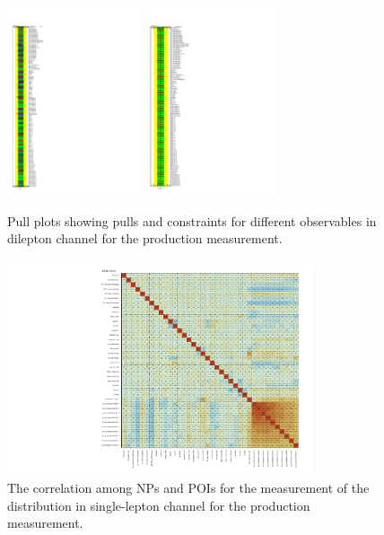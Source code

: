 \begin{figure}[ht]
  \centering
  \includegraphics[width=0.35\textwidth]{figures/diff_xsec/dilep_tty_prod_mu_blinded/compare_NP_pulls/compare_NP_dilep_fits_detall_dphill_eta/NuisPar_comp.pdf}%
  \includegraphics[width=0.35\textwidth]{figures/diff_xsec/dilep_tty_prod_mu_blinded/compare_NP_pulls/compare_NP_dilep_fits_drphb_drlj/NuisPar_comp.pdf}%
  \caption{Pull plots showing pulls and constraints for different observables in dilepton channel for the \tty production measurement.}
  \label{fig:pull_plot_pt_tty_dec_free_dilep_mu_blinded_2}
\end{figure}
\FloatBarrier

\begin{figure}[ht]
  \centering
  \includegraphics[width=0.8\textwidth]{figures/diff_xsec/ljet_tty_prod_mu_blinded/correlations/tty1l_pt_all_syst/CorrMatrix.pdf}
  \caption{The correlation among NPs and POIs for the measurement of the \ptgamma distribution in single-lepton channel for the \tty production measurement.}
  \label{fig:NP_corr_ljet_mu_blinded}
\end{figure}
\FloatBarrier


